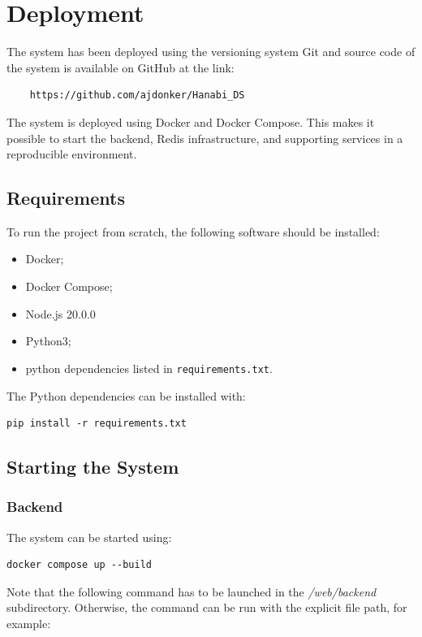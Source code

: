 \documentclass{scrartcl}
\begin{document}
\section{Deployment}\label{deployment}

The system has been deployed using the versioning system Git and source code of the system is available on GitHub at the link:
\begin{verbatim}
    https://github.com/ajdonker/Hanabi_DS
\end{verbatim}
The system is deployed using Docker and Docker Compose. This makes it possible to start the backend, Redis infrastructure, and supporting services in a reproducible environment.

\subsection{Requirements}

To run the project from scratch, the following software should be installed:

\begin{itemize}
    \item Docker;
    \item Docker Compose;
    \item Node.js 20.0.0
    \item Python3;
    \item python dependencies listed in \texttt{requirements.txt}.
\end{itemize}
The Python dependencies can be installed with:

\begin{verbatim}
pip install -r requirements.txt
\end{verbatim}

\subsection{Starting the System}

\subsubsection{Backend}

The system can be started using:
\begin{verbatim}
docker compose up --build
\end{verbatim}

Note that the following command has to be launched in the \emph{/web/backend} subdirectory.
Otherwise, the command can be run with the explicit file path, for example:
\end{document}
